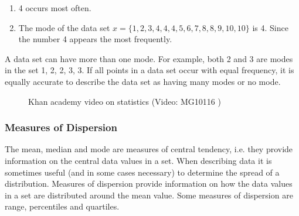 \begin{description}[noitemsep]
\begin{description}[noitemsep]
{\begin{mdframed}[linewidth=4, leftmargin=40, rightmargin=40]
\begin{exercise}
\begin{enumerate}[noitemsep, label=\textbf{Step} \textbf{\arabic*}. ]
\begin{table}[H]
\begin{center}
\begin{xtabular}[t]{|l|l|l|l|}
    \end{xtabular}
      \end{center}
    \begin{center}{\small\bfseries Table 16.10}\end{center}
    \begin{caption}{\small\bfseries Table 16.10}\end{caption}
\end{table}
    \par
          \item  
          \label{m39400*id212553}4 occurs most often.\par 
          \item  
          \label{m39400*id212560}The mode of the data set $x=\{1,2,3,4,4,4,5,6,7,8,8,9,10,10\}$ is 4. Since the number 4 appears the most frequently. \par 
          \end{enumerate}
    \end{exercise}
    \end{mdframed}
    }
    \noindent
          \label{m39400*id212650}A data set can have more than one mode. For example, both 2 and 3 are modes in the set 1, 2, 2, 3, 3. If all points in a data set occur with equal frequency, it is equally accurate to describe the data set as having many modes or no mode.\par 
        \label{m39400*eip-977}
    \setcounter{subfigure}{0}
	\begin{figure}[H] %
    \textnormal{Khan academy video on statistics}\vspace{.1in} \nopagebreak
  \label{m39400*yt-media1}\label{m39400*yt-video1}
             { (Video:  MG10116 )}
      \vspace{2pt}
    \vspace{.1in}
 \end{figure}       \par 
      \label{m39400*uid70}
            \subsubsection{ Measures of Dispersion}
            \nopagebreak
        \label{m39400*id212665}The mean, median and mode are measures of central tendency, i.e. they provide information on the central data values in a set. When describing data it is sometimes useful (and in some cases necessary) to determine the spread of a distribution. Measures of dispersion provide information on how the data values in a set are distributed around the mean value. Some measures of dispersion are range, percentiles and quartiles.\par 
        \label{m39400*uid71}

\end{description}
\end{description}
